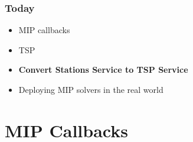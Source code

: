 \documentclass{beamer}
\begin{document}
\begin{frame}
  \frametitle{Today}
  \begin{itemize}
  \item MIP callbacks\pause
  \item TSP\pause
  \item {\bf Convert Stations Service to TSP Service}\pause
  \item Deploying MIP solvers in the real world
  \end{itemize}

\end{frame}


\section{MIP Callbacks}
\subsection{}
\end{document}
